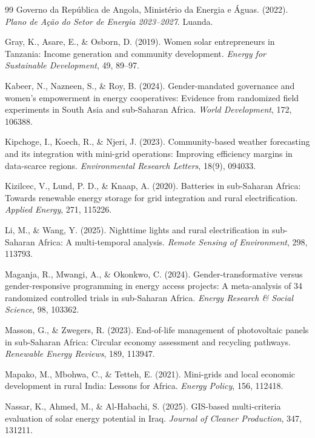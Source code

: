 \documentclass[12pt, a4paper]{article}
\begin{document}
\begin{thebibliography}{99}
 Governo da República de Angola, Ministério da Energia e Águas. (2022). \textit{Plano de Ação do Setor de Energia 2023--2027}. Luanda.

 Gray, K., Asare, E., \& Osborn, D. (2019). Women solar entrepreneurs in Tanzania: Income generation and community development. \textit{Energy for Sustainable Development}, 49, 89--97.

 Kabeer, N., Nazneen, S., \& Roy, B. (2024). Gender-mandated governance and women's empowerment in energy cooperatives: Evidence from randomized field experiments in South Asia and sub-Saharan Africa. \textit{World Development}, 172, 106388.

 Kipchoge, I., Koech, R., \& Njeri, J. (2023). Community-based weather forecasting and its integration with mini-grid operations: Improving efficiency margins in data-scarce regions. \textit{Environmental Research Letters}, 18(9), 094033.

 Kizilcec, V., Lund, P. D., \& Knaap, A. (2020). Batteries in sub-Saharan Africa: Towards renewable energy storage for grid integration and rural electrification. \textit{Applied Energy}, 271, 115226.

 Li, M., \& Wang, Y. (2025). Nighttime lights and rural electrification in sub-Saharan Africa: A multi-temporal analysis. \textit{Remote Sensing of Environment}, 298, 113793.

 Maganja, R., Mwangi, A., \& Okonkwo, C. (2024). Gender-transformative versus gender-responsive programming in energy access projects: A meta-analysis of 34 randomized controlled trials in sub-Saharan Africa. \textit{Energy Research \& Social Science}, 98, 103362.

 Masson, G., \& Zwegers, R. (2023). End-of-life management of photovoltaic panels in sub-Saharan Africa: Circular economy assessment and recycling pathways. \textit{Renewable Energy Reviews}, 189, 113947.


 Mapako, M., Mbohwa, C., \& Tetteh, E. (2021). Mini-grids and local economic development in rural India: Lessons for Africa. \textit{Energy Policy}, 156, 112418.

 Nassar, K., Ahmed, M., \& Al-Habachi, S. (2025). GIS-based multi-criteria evaluation of solar energy potential in Iraq. \textit{Journal of Cleaner Production}, 347, 131211.


\end{thebibliography}
\end{document}
